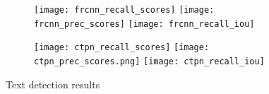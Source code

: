 		\begin{figure}
			\vspace{-2em}
			\begin{subfigure}{.49\linewidth}
					\caption{\FRCNN{}}\label{fig:frcnn_results}
					\texttt{[image: frcnn\_recall\_scores]}
					\texttt{[image: frcnn\_prec\_scores]}
					\texttt{[image: frcnn\_recall\_iou]}
			\end{subfigure}
			\begin{subfigure}{.49\linewidth}
					\caption{\CTPN{}}\label{fig:ctpn_results}
					\texttt{[image: ctpn\_recall\_scores]}
					\texttt{[image: ctpn\_prec\_scores.png]}
					\texttt{[image: ctpn\_recall\_iou]}
			\end{subfigure}
			\caption{Text detection results}
		\end{figure}
